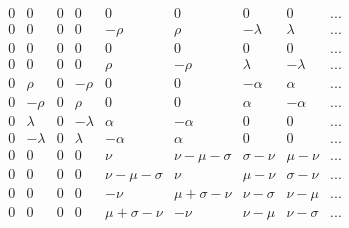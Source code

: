 \documentclass[12pt]{article}
\begin{document}
\begin{displaymath}
\begin{array}{ccccccccc}
 0 & 0 & 0 & 0 &  0 & 0 & 0 & 0 & ... \\
 0 & 0 & 0 & 0 &  -\rho & \rho & -\lambda & \lambda &  ... \\
 0 & 0 & 0 & 0 &  0 & 0 & 0 & 0 & ... \\
 0 & 0 & 0 & 0 &  \rho & -\rho & \lambda & -\lambda & ... \\

 0 & \rho & 0 & -\rho &  0 & 0 & -\alpha & \alpha & ... \\
 0 & -\rho & 0 & \rho &  0 & 0 & \alpha & -\alpha & ... \\
 0 & \lambda & 0 & -\lambda &  \alpha & -\alpha & 0 & 0 & ... \\
 0 & -\lambda & 0 & \lambda &  -\alpha & \alpha & 0 & 0 & ... \\

 0 & 0 & 0 & 0 &  \nu & \nu-\mu-\sigma & \sigma-\nu & \mu-\nu & ... \\
 0 & 0 & 0 & 0 &  \nu-\mu-\sigma & \nu & \mu-\nu & \sigma-\nu & ... \\
 0 & 0 & 0 & 0 &  -\nu & \mu+\sigma-\nu & \nu-\sigma & \nu-\mu & ... \\
 0 & 0 & 0 & 0 &  \mu+\sigma-\nu & -\nu & \nu-\mu & \nu-\sigma & ... \\


\end{array}
\end{displaymath}
\end{document}
